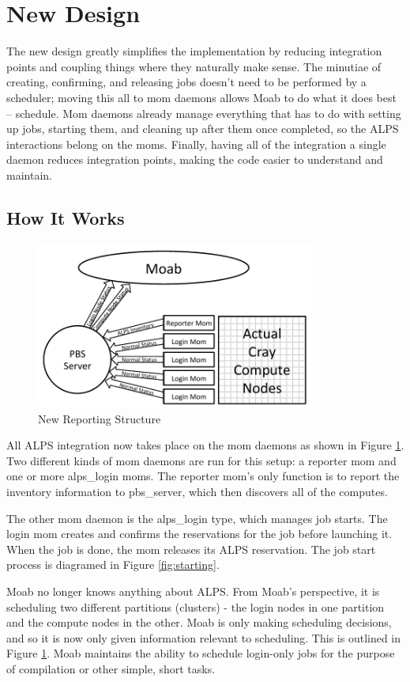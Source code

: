 \section{New Design}

The new design greatly simplifies the implementation by reducing integration
points and coupling things where they naturally make sense. The minutiae of
creating, confirming, and releasing jobs doesn't need to be performed by a
scheduler; moving this all to mom daemons allows Moab to do what it does best –
schedule. Mom daemons already manage everything that has to do with setting up
jobs, starting them, and cleaning up after them once completed, so the ALPS
interactions belong on the moms. Finally, having all of the integration a
single daemon reduces integration points, making the code easier to understand
and maintain.

\subsection{How It Works}
\begin{figure}
  \centering
  \includegraphics[width=3.6in]{figures/new-diagram.pdf}
  \caption{New Reporting Structure}\label{fig:reporting}
\end{figure}

All ALPS integration now takes place on the mom daemons as shown in Figure
\ref{fig:reporting}. Two different kinds of mom daemons are run for this setup:
a reporter mom and one or more alps_login moms. The reporter mom's only
function is to report the inventory information to pbs_server, which then
discovers all of the computes.

The other mom daemon is the alps_login type, which manages job starts. The
login mom creates and confirms the reservations for the job before launching
it. When the job is done, the mom releases its ALPS reservation. The job start
process is diagramed in Figure \ref{fig:starting}.

Moab no longer knows anything about ALPS. From Moab's perspective, it is
scheduling two different partitions (clusters) - the login nodes in one
partition and the compute nodes in the other. Moab is only making scheduling
decisions, and so it is now only given information relevant to scheduling. This
is outlined in Figure \ref{fig:reporting}. Moab maintains the ability to
schedule login-only jobs for the purpose of compilation or other simple, short
tasks.

